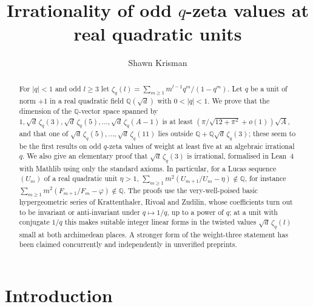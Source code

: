 \documentclass[11pt]{amsart}
\theoremstyle{definition}
\theoremstyle{remark}
\numberwithin{equation}{section}
\newcommand{\QQ}{\mathbb{Q}}
\begin{document}
\title[Odd $q$-zeta values at real quadratic units]{Irrationality of odd $q$-zeta values at real quadratic units}

\author{Shawn Krisman}


\begin{abstract}
For $|q|<1$ and odd $l\ge3$ let $\zeta_q(l)=\sum_{m\ge1}m^{l-1}q^m/(1-q^m)$. Let $q$ be a unit of norm $+1$ in a
real quadratic field $\QQ(\sqrt d)$ with $0<|q|<1$. We prove that the dimension of the $\QQ$-vector space spanned by
$1,\sqrt d\,\zeta_q(3),\sqrt d\,\zeta_q(5),\dots,\sqrt d\,\zeta_q(A-1)$ is at least $(\pi/\sqrt{12+\pi^2}+o(1))\sqrt A$,
and that one of $\sqrt d\,\zeta_q(5),\dots,\sqrt d\,\zeta_q(11)$ lies outside $\QQ+\QQ\sqrt d\,\zeta_q(3)$; these
seem to be the first results on odd $q$-zeta values of weight at least five at an algebraic irrational $q$. We also give
an elementary proof that $\sqrt d\,\zeta_q(3)$ is irrational, formalised in Lean~4 with Mathlib using only the standard
axioms. In particular, for a Lucas sequence $(U_m)$ of a real quadratic unit $\eta>1$,
$\sum_{m\ge1}m^2(U_{m+1}/U_m-\eta)\notin\QQ$, for instance $\sum_{m\ge1}m^2(F_{m+1}/F_m-\varphi)\notin\QQ$. The proofs
use the very-well-poised basic hypergeometric series of Krattenthaler, Rivoal and Zudilin, whose coefficients turn out
to be invariant or anti-invariant under $q\mapsto1/q$, up to a power of $q$; at a unit with conjugate $1/q$ this makes suitable integer linear
forms in the twisted values $\sqrt d\,\zeta_q(l)$ small at both archimedean places. A stronger form of the weight-three statement has been claimed concurrently and
independently in unverified preprints.
\end{abstract}

\maketitle

\section{Introduction}
\end{document}
